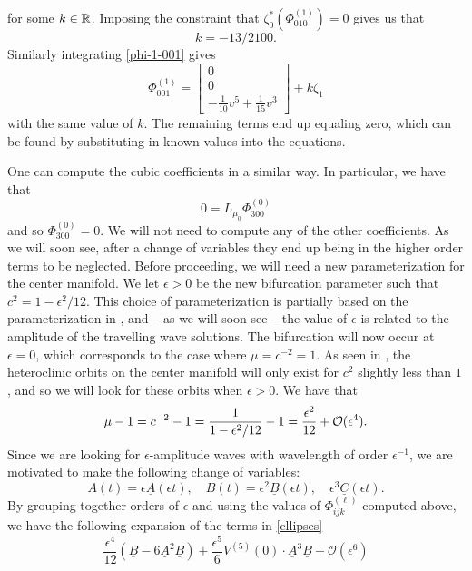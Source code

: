 for some \(k\in \mathbb{R}\). Imposing the constraint that \(\zeta_0^*(\Phi_{010}^{(1)}) = 0\) gives us that \[k = -13/2100.\] Similarly integrating \cref{phi-1-001} gives
\begin{equation}
	\Phi_{001}^{(1)} = \begin{bmatrix}
		0 \\ 0 \\ - \frac 1 {10} v^5 + \frac 1 {15} v^3
	\end{bmatrix} + k  \zeta_1
\end{equation}
with the same value of \(k\). The remaining terms end up equaling zero, which can be found by substituting in known values into the equations.

One can compute the cubic coefficients in a similar way. In particular, we have that 
\begin{equation}
	0 = L_{\mu_0}\Phi_{300}^{(0)}
\end{equation}
and so \(\Phi_{300}^{(0)} = 0\).
We will not need to compute any of the other coefficients. As we will soon see, after a change of variables they end up being in the higher order terms to be neglected. Before proceeding, we will need a new parameterization for the center manifold. We let \(\epsilon > 0\) be the new bifurcation parameter such that \(c^{2} = 1- \epsilon^2/12\). This choice of parameterization is partially based on the parameterization in \cite{friesecke1999solitary}, and -- as we will soon see -- the value of \(\epsilon\) is related to the amplitude of the travelling wave solutions. The bifurcation will now occur at \(\epsilon = 0\), which corresponds to the case where \(\mu = c^{-2} = 1\). As seen in \cite{iooss2000travelling}, the heteroclinic orbits on the center manifold will only exist for \(c^2\) slightly less than \(1\), and so we will look for these orbits when \(\epsilon > 0\). We have that \[\mu-1 = c^{-2} - 1 = \frac 1 {1-\epsilon^2/12} -1 = \frac {\epsilon^2}{12} +\mathcal{O}(\epsilon^4).\] Since we are looking for \(\epsilon\)-amplitude waves with wavelength of order \(\epsilon^{-1}\), we are motivated to make the following change of variables:
\begin{equation}
	A(t) = \epsilon \underline A (\epsilon t), \quad B(t) = \epsilon^2 \underline B(\epsilon t), \quad \epsilon^3 \underline C(\epsilon t).
\end{equation}
By grouping together orders of \(\epsilon\) and using the values of \(\Phi^{(\ell)}_{ijk}\) computed above, we have the following expansion of the terms in \cref{ellipses}
\begin{equation}
	\frac {\epsilon^4} {12} (\underline B - 6\underline A^2 \underline B) + \frac {\epsilon^5} 6 V^{(5)}(0) \cdot \underline A^3\underline B + \mathcal O (\epsilon^6)
\end{equation}
